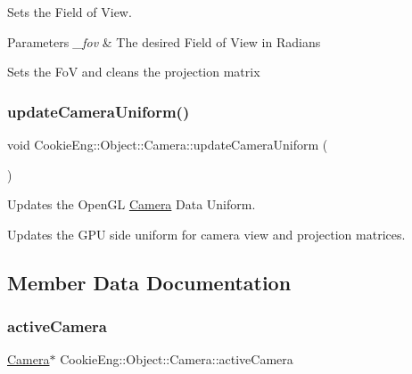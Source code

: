 Sets the Field of View. 


\begin{DoxyParams}{Parameters}
{\em \+\_\+fov} & The desired Field of View in Radians\\
\hline
\end{DoxyParams}
Sets the FoV and cleans the projection matrix \mbox{\label{class_cookie_eng_1_1_object_1_1_camera_a0b8a35f92490adf193d36f2906a2c1d8}} 
\subsubsection{\texorpdfstring{update\+Camera\+Uniform()}{updateCameraUniform()}}
{\footnotesize\ttfamily void Cookie\+Eng\+::\+Object\+::\+Camera\+::update\+Camera\+Uniform (\begin{DoxyParamCaption}{ }\end{DoxyParamCaption})}



Updates the Open\+GL \hyperlink{class_cookie_eng_1_1_object_1_1_camera}{Camera} Data Uniform. 

Updates the G\+PU side uniform for camera view and projection matrices. 

\subsection{Member Data Documentation}
\mbox{\label{class_cookie_eng_1_1_object_1_1_camera_a552d79d05b0478c0ce92aa1d673ea1a7}} 
\subsubsection{\texorpdfstring{active\+Camera}{activeCamera}}
{\footnotesize\ttfamily \hyperlink{class_cookie_eng_1_1_object_1_1_camera}{Camera}$\ast$ Cookie\+Eng\+::\+Object\+::\+Camera\+::active\+Camera\hspace{0.3cm}{\ttfamily [static]}}

